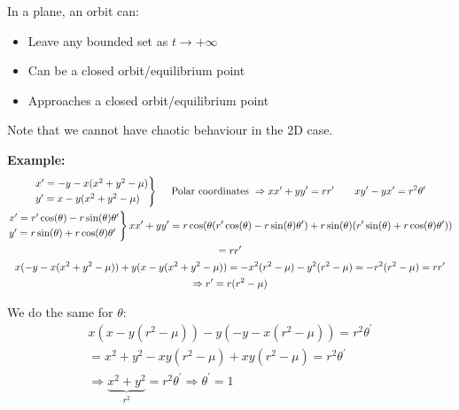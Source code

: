 \par\bigskip
\noindent In a plane, an orbit can:\par
\begin{itemize}
  \item Leave any bounded set as $t\to+\infty$
  \item Can be a closed orbit/equilibrium point 
  \item Approaches a closed orbit/equilibrium point
\end{itemize}
\par\bigskip
\noindent Note that we cannot have chaotic behaviour in the 2D case.
\par\bigskip
\noindent\textbf{Example:}
\begin{equation*}
  \begin{gathered}
    \begin{rcases*}
      x^{\prime} = -y-x(x^2+y^2-\mu)\\
      y^{\prime} = x-y(x^2+y^2-\mu)
    \end{rcases*}\quad\text{ Polar coordinates }\Rightarrow xx^{\prime}+yy^{\prime}=rr^{\prime}\qquad xy^{\prime}-yx^{\prime} = r^2\theta^{\prime}\\
    \begin{rcases*}
      x^{\prime} = r^{\prime}\cos(\theta)-r\sin(\theta)\theta^{\prime}\\
      y^{\prime} = r\sin(\theta)+r\cos(\theta)\theta^{\prime}
    \end{rcases*} xx^{\prime}+yy^{\prime}=r\cos(\theta(r^{\prime}\cos(\theta)-r\sin(\theta)\theta^{\prime})+r\sin(\theta)(r^{\prime}\sin(\theta)+r\cos(\theta)\theta^{\prime}))\\
    = rr^{\prime}\\
    x(-y-x(x^2+y^2-\mu)) + y(x-y(x^2+y^2-\mu)) = -x^2(r^2-\mu)-y^2(r^2-\mu) = -r^2(r^2-\mu) = rr^{\prime}\\
    \Rightarrow r^{\prime} = r(r^2-\mu)
  \end{gathered}
\end{equation*}\par
\noindent We do the same for $\theta$:
\begin{equation*}
  \begin{gathered}
    x(x-y(r^2-\mu))-y(-y-x(r^2-\mu)) = r^2\theta^{\prime}\\
    = x^2+y^2-xy(r^2-\mu)+xy(r^2-\mu) = r^2\theta^{\prime}\\
    \Rightarrow \underbrace{x^2+y^2}_{r^2} = r^2\theta^{\prime}\Rightarrow\theta^{\prime} = 1
  \end{gathered}
\end{equation*}\par
